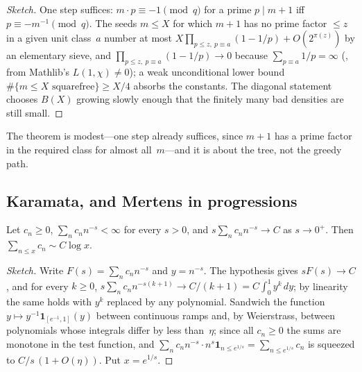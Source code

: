 \documentclass[10pt,a4paper]{article}
\begin{document}
\begin{proof}[Sketch]
One step suffices: $m\cdot p\equiv-1\pmod q$ for a prime $p\mid m+1$ iff
$p\equiv-m^{-1}\pmod q$.  The seeds $m\le X$ for which $m+1$ has no prime
factor $\le z$ in a given unit class~$a$ number at most
$X\prod_{p\le z,\ p\equiv a}(1-1/p)+O(2^{\pi(z)})$ by an elementary sieve,
and $\prod_{p\le z,\ p\equiv a}(1-1/p)\to0$ because
$\sum_{p\equiv a}1/p=\infty$
(,
from Mathlib's $L(1,\chi)\ne0$); a weak unconditional lower bound
$\#\{m\le X\text{ squarefree}\}\ge X/4$ absorbs the constants.  The
diagonal statement chooses $B(X)$ growing slowly enough that the finitely
many bad densities are still small.
\end{proof}  The
theorem is modest---one step already suffices, since $m+1$ has a prime
factor in the required class for almost all~$m$---and it is about the
tree, not the greedy path.

\subsection{Karamata, and Mertens in progressions}

\begin{theorem}
Let $c_n\ge0$, $\sum_n c_n n^{-s}<\infty$ for every $s>0$, and
$s\sum_n c_n n^{-s}\to C$ as $s\to0^+$.  Then $\sum_{n\le x}c_n\sim C\log x$.
\end{theorem}

\begin{proof}[Sketch]
Write $F(s)=\sum_nc_nn^{-s}$ and $y=n^{-s}$.  The hypothesis gives
$sF(s)\to C$, and for every $k\ge0$, $s\sum_nc_nn^{-s(k+1)}\to C/(k+1)
=C\int_0^1y^{k}\,dy$; by linearity the same holds with $y^{k}$ replaced by
any polynomial.  Sandwich the function $y\mapsto y^{-1}\mathbf 1_{[e^{-1},1]}(y)$
between continuous ramps and, by Weierstrass, between polynomials whose
integrals differ by less than~$\eta$; since all $c_n\ge0$ the sums are
monotone in the test function, and $\sum_nc_nn^{-s}\cdot n^{s}\mathbf 1_{n\le e^{1/s}}
=\sum_{n\le e^{1/s}}c_n$ is squeezed to $C/s\,(1+O(\eta))$.  Put $x=e^{1/s}$.
\end{proof}
\end{document}
